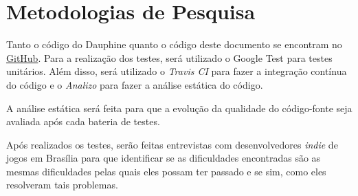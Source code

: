 \chapter[Metodologias de Pesquisa]{Metodologias de Pesquisa}

Tanto o código do Dauphine quanto o código deste documento se encontram no \href{https://github.com/CaioIcy/Dauphine}{GitHub}. Para a realização dos testes, será utilizado o Google Test para testes unitários. Além disso, será utilizado o \textit{Travis CI} para fazer a integração contínua do código e o \textit{Analizo} para fazer a análise estática do código.

A análise estática será feita para que a evolução da qualidade do código-fonte seja avaliada após cada bateria de testes. 

Após realizados os testes, serão feitas entrevistas com desenvolvedores \textit{indie} de jogos em Brasília para que identificar se as dificuldades encontradas são as mesmas dificuldades pelas quais eles possam ter passado e se sim, como eles resolveram tais problemas.
